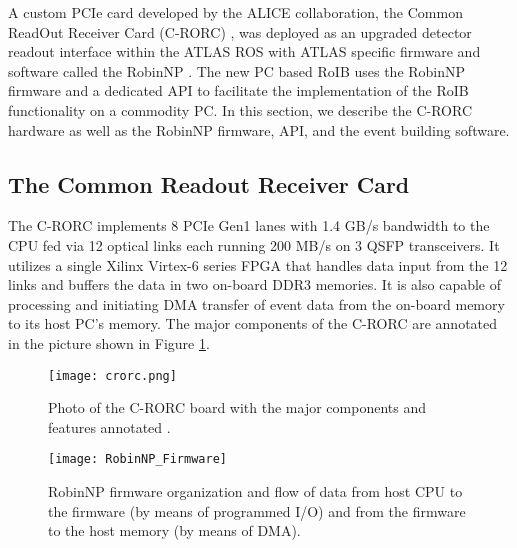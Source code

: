  A custom PCIe card developed by the ALICE collaboration, the Common ReadOut Receiver Card (C-RORC) \cite{alice}, was deployed as an 
upgraded detector readout interface within the ATLAS ROS with ATLAS specific firmware and software called the RobinNP \cite{crorc}. 
The new PC based RoIB uses the RobinNP firmware and a dedicated API to facilitate the implementation of the RoIB functionality 
on a commodity PC. In this section, we describe the C-RORC hardware as well as the RobinNP firmware, API, and the event building software. 
\subsection{The Common Readout Receiver Card}\label{sec:crorc}

The C-RORC implements 8 PCIe Gen1 lanes with 1.4 GB/s bandwidth to the CPU fed via 12 optical links each running 200 MB/s on 3 QSFP transceivers. It utilizes a single Xilinx Virtex-6 series FPGA that handles data input from the 12 links and buffers the data in two on-board DDR3 memories. It is also capable of processing and initiating DMA transfer of event data from the on-board memory to its host PC's memory. The major components of the C-RORC are annotated 
in the picture shown in Figure \ref{fig:crorc}.


\begin{figure}[tbp] %
\centering
\texttt{[image: crorc.png]}
\caption{Photo of the C-RORC board with the major components and features annotated \cite{crorc}.}
\label{fig:crorc}
\end{figure}

\begin{figure}[tbp] %
\centering
\texttt{[image: RobinNP\_Firmware]}

\caption{RobinNP firmware organization
and  flow  of  data  from  host  CPU  to  the
firmware  (by  means  of  programmed  I/O)
and from the firmware to the host memory
(by means of DMA).}
\label{fig:robinnp_fw}
\end{figure}

